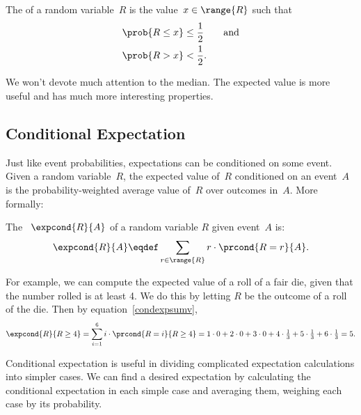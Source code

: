\begin{definition}%
The  of a random variable~$R$ is the value~$x \in
\range{R}$ such that
\begin{align*}
    \prob{R \le x} & \le \frac{1}{2} \qquad \text{and} \\
    \prob{R > x}   & <    \frac{1}{2}.
\end{align*}
\end{definition}

We won't devote much attention to the median.  The expected value is
more useful and has much more interesting properties.

\iffalse
\footnote{Some texts define the median to be the
  value of $x \in \range{R}$ for which $\prob{R \le x} < 1/2$ and
  $\prob{R > x} \le 1/2$.  The difference in definitions is
  not important.}
\fi


\subsection{Conditional Expectation}

Just like event probabilities, expectations can be conditioned on some
event.  Given a random variable~$R$, the expected value of~$R$
conditioned on an event~$A$ is the probability-weighted average value
of~$R$ over outcomes in~$A$.  More formally:
\begin{definition}\label{condexpdef} %
The ~$\expcond{R}{A}$ of a random
variable $R$ given event~$A$ is:
\begin{equation}\label{condexpsumv}
\expcond{R}{A} \eqdef \sum_{r \in \range{R}} r \cdot\prcond{R=r}{A}.
\end{equation}
\end{definition}
\iffalse
In other words, it is the average value of the variable $R$ when values
are weighted by their conditional probabilities given $A$.
\fi

For example, we can compute the expected value of a roll of a fair
die, given that the number rolled is at least 4.  We do this by
letting $R$ be the outcome of a roll of the die.  Then by
equation~\eqref{condexpsumv},
\[
\expcond{R}{R \geq 4} = \sum_{i=1}^6 i \cdot \prcond{R=i}{R \ge 4}
= 1\cdot 0 + 2\cdot 0 + 3\cdot 0 +
  4\cdot\tfrac{1}{3} + 5\cdot\tfrac{1}{3} + 6\cdot\tfrac{1}{3}
= 5.
\]

Conditional expectation is useful in dividing complicated expectation
calculations into simpler cases.  We can find a desired expectation
by calculating the conditional expectation in each simple case and
averaging them, weighing each case by its probability.

